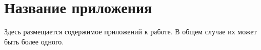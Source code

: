 \section{Название приложения}
\label{sec:Appendix_}

Здесь размещается содержимое приложений к работе. В общем случае их может быть более одного.